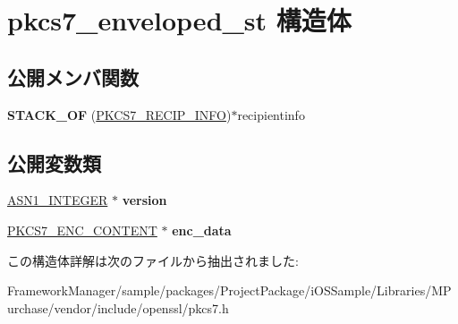 \hypertarget{structpkcs7__enveloped__st}{}\section{pkcs7\+\_\+enveloped\+\_\+st 構造体}
\label{structpkcs7__enveloped__st}
\subsection*{公開メンバ関数}
\begin{DoxyCompactItemize}
\item 
\hypertarget{structpkcs7__enveloped__st_ab79505d091a2289a9c5fd3d3131a7daf}{}{\bfseries S\+T\+A\+C\+K\+\_\+\+O\+F} (\hyperlink{structpkcs7__recip__info__st}{P\+K\+C\+S7\+\_\+\+R\+E\+C\+I\+P\+\_\+\+I\+N\+F\+O})$\ast$recipientinfo\label{structpkcs7__enveloped__st_ab79505d091a2289a9c5fd3d3131a7daf}

\end{DoxyCompactItemize}
\subsection*{公開変数類}
\begin{DoxyCompactItemize}
\item 
\hypertarget{structpkcs7__enveloped__st_ae2f1117cfce2ed9ac25db876eea35c74}{}\hyperlink{structasn1__string__st}{A\+S\+N1\+\_\+\+I\+N\+T\+E\+G\+E\+R} $\ast$ {\bfseries version}\label{structpkcs7__enveloped__st_ae2f1117cfce2ed9ac25db876eea35c74}

\item 
\hypertarget{structpkcs7__enveloped__st_a70fb3ace75518cf782f9e0330f4a140e}{}\hyperlink{structpkcs7__enc__content__st}{P\+K\+C\+S7\+\_\+\+E\+N\+C\+\_\+\+C\+O\+N\+T\+E\+N\+T} $\ast$ {\bfseries enc\+\_\+data}\label{structpkcs7__enveloped__st_a70fb3ace75518cf782f9e0330f4a140e}

\end{DoxyCompactItemize}


この構造体詳解は次のファイルから抽出されました\+:\begin{DoxyCompactItemize}
\item 
Framework\+Manager/sample/packages/\+Project\+Package/i\+O\+S\+Sample/\+Libraries/\+M\+Purchase/vendor/include/openssl/pkcs7.\+h\end{DoxyCompactItemize}
